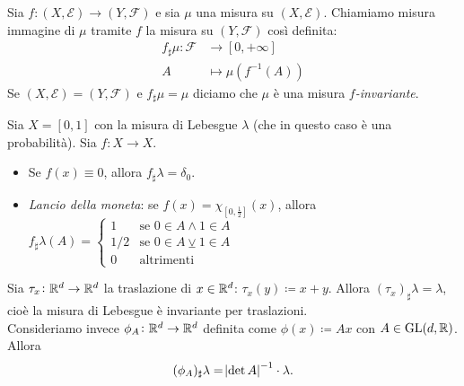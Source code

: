 \begin{definition}
	Sia $ f\colon (X,\mathcal{E}) \to (Y,\mathcal{F}) $ e sia $ \mu $ una misura su $ (X,\mathcal{E}) $. Chiamiamo misura immagine di $ \mu $ tramite $ f $ la misura su $ (Y, \mathcal{F}) $ così definita:
	\begin{align*}
		f_\sharp \mu\colon \mathcal{F} & \to [0,+\infty]                      \\
		A                              & \mapsto \mu \left( f^{-1}(A) \right)
	\end{align*}
	Se $ (X,\mathcal{E}) = (Y,\mathcal{F}) $ e $ f_\sharp\mu = \mu $ diciamo che $ \mu $ è una misura \emph{$ f $-invariante}.
\end{definition}

\begin{example}
	Sia $ X = [0,1] $ con la misura di Lebesgue $ \lambda $ (che in questo caso è una probabilità). Sia $ f\colon X\to X $.
	\begin{itemize}
		\item Se $ f(x) \equiv 0 $, allora $ f_\sharp \lambda = \delta_0 $.
		\item \emph{Lancio della moneta}: se $ f(x) = \chi_{[0,\frac{1}{2}]}(x) $, allora $ f_\sharp \lambda (A) =
		\begin{cases}
			1	& \text{se } 0\in A \wedge 1 \in A \\
			1/2 & \text{se } 0\in A \veebar 1\in A \\
			0			& \text{altrimenti}
		\end{cases} $
	\end{itemize}
\end{example}

\begin{example}
	Sia $ \tau_x\colon \mathbb{R}^d\to\mathbb{R}^d $ la traslazione di $ x\in\mathbb{R}^d $: $ \tau_x(y) \coloneqq x+y $. Allora $ (\tau_x)_\sharp\lambda = \lambda $, cioè la misura di Lebesgue è invariante per traslazioni. \\
    Consideriamo invece $ \phi_A\colon\mathbb{R}^d\to\mathbb{R}^d $ definita come $ \phi(x) \coloneqq Ax $ con $ A \in\mathrm{GL}(d,\mathbb{R}) $. Allora 
    \[
        (\phi_A)_\sharp\lambda = \abs{\det A}^{-1} \cdot \lambda.
    \] 
\end{example}
